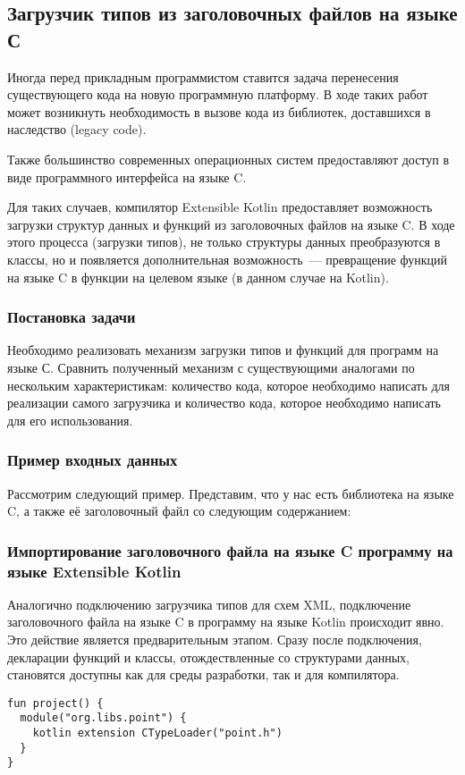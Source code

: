 \subsection{Загрузчик типов из заголовочных файлов на языке С}\label{c-loader}
Иногда перед прикладным программистом ставится задача перенесения существующего кода на новую программную платформу.
В ходе таких работ может возникнуть необходимость в вызове кода из библиотек, доставшихся в наследство (legacy code).

Также большинство современных операционных систем предоставляют доступ в виде программного интерфейса на языке C.

Для таких случаев, компилятор Extensible Kotlin предоставляет возможность загрузки структур данных и функций из заголовочных файлов на языке C.
В ходе этого процесса (загрузки типов), не только структуры данных преобразуются в классы, но и появляется дополнительная возможность~--- превращение функций на языке C в функции на целевом языке (в данном случае на Kotlin).

\subsubsection{Постановка задачи}
\td Необходимо реализовать механизм загрузки типов и функций для программ на языке С.
Сравнить полученный механизм с существующими аналогами по нескольким характеристикам: количество кода, которое необходимо написать для реализации самого загрузчика и количество кода, которое необходимо написать для его использования.

\begin{code}
\subsubsection{Пример входных данных}
Рассмотрим следующий пример. Представим, что у нас есть библиотека на языке C, а также её заголовочный файл со следующим содержанием:

\end{code}

\subsubsection{Импортирование заголовочного файла на языке C программу на языке Extensible Kotlin}
Аналогично подключению загрузчика типов для схем XML, подключение заголовочного файла на языке C в программу на языке Kotlin происходит явно.
Это действие является предварительным этапом. Сразу после подключения, декларации функций и классы, отождествленные со структурами данных, становятся доступны как для среды разработки, так и для компилятора.
\begin{code}\begin{lstlisting}[caption={Подключение заголовочного файла на языке C в программу на языке Kotlin.}, label={c-type-loading-extension-point}]
fun project() {
  module("org.libs.point") {
    kotlin extension CTypeLoader("point.h")
  }
}
\end{lstlisting}\end{code}

